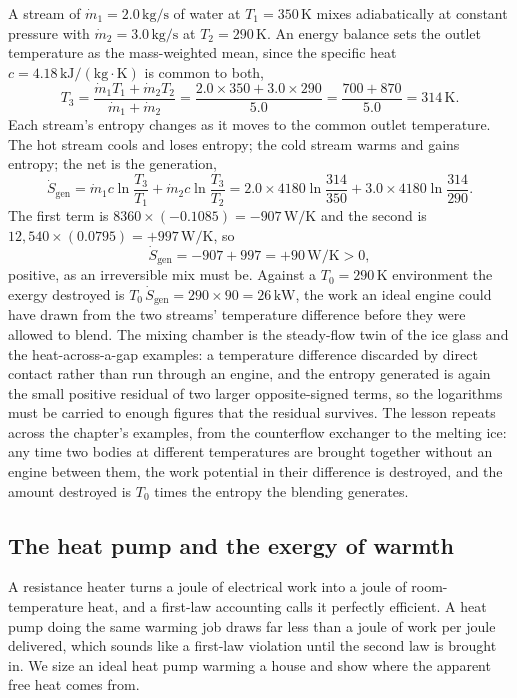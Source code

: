 A stream of $\dot m_1 = 2.0\,\text{kg}/\text{s}$ of water at $T_1 = 350\,
\si{\kelvin}$ mixes adiabatically at constant pressure with $\dot m_2 = 3.0\,
\text{kg}/\text{s}$ at $T_2 = 290\,\si{\kelvin}$. An energy balance sets the outlet
temperature as the mass-weighted mean, since the specific heat $c = 4.18\,
\text{kJ}/(\text{kg}\cdot\si{\kelvin})$ is common to both,
\[
T_3 = \frac{\dot m_1 T_1 + \dot m_2 T_2}{\dot m_1 + \dot m_2}
= \frac{2.0\times 350 + 3.0\times 290}{5.0}
= \frac{700 + 870}{5.0} = 314\,\si{\kelvin}.
\]
Each stream's entropy changes as it moves to the common outlet temperature. The
hot stream cools and loses entropy; the cold stream warms and gains entropy; the
net is the generation,
\[
\dot S_{\text{gen}} = \dot m_1 c \ln\frac{T_3}{T_1} + \dot m_2 c \ln\frac{T_3}{T_2}
= 2.0\times 4180 \ln\frac{314}{350} + 3.0\times 4180 \ln\frac{314}{290}.
\]
The first term is $8360\times(-0.1085) = -907\,\si{\watt\per\kelvin}$ and the
second is $12{,}540\times(0.0795) = +997\,\si{\watt\per\kelvin}$, so
\[
\dot S_{\text{gen}} = -907 + 997 = +90\,\si{\watt\per\kelvin} > 0,
\]
positive, as an irreversible mix must be. Against a $T_0 = 290\,\si{\kelvin}$
environment the exergy destroyed is $T_0\,\dot S_{\text{gen}} = 290\times 90 =
26\,\text{kW}$, the work an ideal engine could have drawn from the two streams'
temperature difference before they were allowed to blend. The mixing chamber is
the steady-flow twin of the ice glass and the heat-across-a-gap examples: a
temperature difference discarded by direct contact rather than run through an
engine, and the entropy generated is again the small positive residual of two
larger opposite-signed terms, so the logarithms must be carried to enough figures
that the residual survives. The lesson repeats across the chapter's examples, from
the counterflow exchanger to the melting ice: any time two bodies at different
temperatures are brought together without an engine between them, the work
potential in their difference is destroyed, and the amount destroyed is
$T_0$ times the entropy the blending generates.

\subsection{The heat pump and the exergy of warmth}

A resistance heater turns a joule of electrical work into a joule of
room-temperature heat, and a first-law accounting calls it perfectly
efficient. A heat pump doing the same warming job draws far less than a joule
of work per joule delivered, which sounds like a first-law violation until the
second law is brought in. We size an ideal heat pump warming a house and show
where the apparent free heat comes from.

